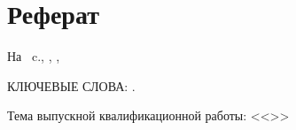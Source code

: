 \chapter*[Count-me]{Реферат} %
\thispagestyle{empty}%
%
%



На ~c.,  
,
,

{\MakeUppercase{Ключевые слова: \keywordsRu}.}

Тема выпускной квалификационной работы: <<\thesisTitle>>


\abstractRu




\printTheAbstract %


